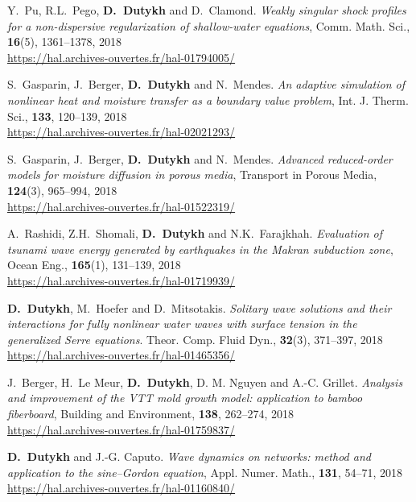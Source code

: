 \begin{etaremune}
  \item Y.~Pu, R.L.~Pego, \textbf{D.~Dutykh} and D.~Clamond. \textit{Weakly singular shock profiles for a non-dispersive regularization of shallow-water equations}, Comm. Math. Sci., \textbf{16}(5), 1361--1378, 2018 \\ %
  \url{https://hal.archives-ouvertes.fr/hal-01794005/}
  
  \item S.~Gasparin, J.~Berger, \textbf{D.~Dutykh} and N.~Mendes. \textit{An adaptive simulation of nonlinear heat and moisture transfer as a boundary value problem}, Int. J. Therm. Sci., \textbf{133}, 120--139, 2018 \\ %
  \url{https://hal.archives-ouvertes.fr/hal-02021293/}

  \item S.~Gasparin, J.~Berger, \textbf{D.~Dutykh} and N.~Mendes. \textit{Advanced reduced-order models for moisture diffusion in porous media}, Transport in Porous Media, \textbf{124}(3), 965--994, 2018 \\ %
  \url{https://hal.archives-ouvertes.fr/hal-01522319/}
  
  \item A.~Rashidi, Z.H.~Shomali, \textbf{D.~Dutykh} and N.K.~Farajkhah. \textit{Evaluation of tsunami wave energy generated by earthquakes in the Makran subduction zone}, Ocean Eng., \textbf{165}(1), 131--139, 2018 \\ %
  \url{https://hal.archives-ouvertes.fr/hal-01719939/}

  \item \textbf{D.~Dutykh}, M.~Hoefer and D.~Mitsotakis. \textit{Solitary wave solutions and their interactions for fully nonlinear water waves with surface tension in the generalized Serre equations}. Theor. Comp. Fluid Dyn., \textbf{32}(3), 371--397, 2018 \\ %
  \url{https://hal.archives-ouvertes.fr/hal-01465356/}

  \item J.~Berger, H.~Le Meur, \textbf{D.~Dutykh}, D. M. Nguyen and A.-C. Grillet. \textit{Analysis and improvement of the VTT mold growth model: application to bamboo fiberboard}, Building and Environment, \textbf{138}, 262--274, 2018 \\ %
  \url{https://hal.archives-ouvertes.fr/hal-01759837/}

  \item \textbf{D.~Dutykh} and J.-G. Caputo. \textit{Wave dynamics on networks: method and application to the sine--Gordon equation}, Appl. Numer. Math., \textbf{131}, 54--71, 2018 \\ %
  \url{https://hal.archives-ouvertes.fr/hal-01160840/}
  

\end{etaremune}
